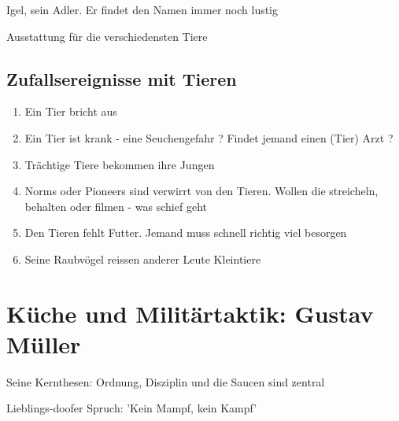 \begin{npcBox}[title=Jonas Ohnesorg]
    \begin{stressSection}
    \end{stressSection}
    \begin{tabularx}{\textwidth}{ XX }
    \end{tabularx}

    \begin{consequences}
    \item {}
    \item {}
    \item {}
    \end{consequences}

    \begin{equipment}
    \item Igel, sein Adler. Er findet den Namen immer noch lustig
    \item Ausstattung für die verschiedensten Tiere
    \end{equipment}
\end{npcBox}


\subsection{Zufallsereignisse mit Tieren}

\begin{enumerate}
\item Ein Tier bricht aus
\item Ein Tier ist krank - eine Seuchengefahr ? Findet jemand einen (Tier) Arzt ?
\item Trächtige Tiere bekommen ihre Jungen
\item Norms oder Pioneers sind verwirrt von den Tieren. Wollen die streicheln, behalten oder filmen - was schief geht
\item Den Tieren fehlt Futter. Jemand muss schnell richtig viel besorgen
\item Seine Raubvögel reissen anderer Leute Kleintiere
\end{enumerate}

\newpage
\section{Küche und Militärtaktik: Gustav Müller}

Seine Kernthesen: Ordnung, Disziplin und die Saucen sind zentral

Lieblings-doofer Spruch: 'Kein Mampf, kein Kampf'


